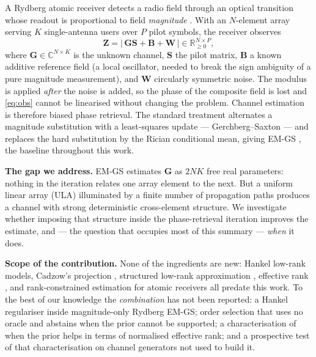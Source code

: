\documentclass[conference]{IEEEtran}
\newcommand{\bG}{\mathbf{G}}
\newcommand{\bS}{\mathbf{S}}
\newcommand{\bB}{\mathbf{B}}
\newcommand{\bW}{\mathbf{W}}
\newcommand{\bZ}{\mathbf{Z}}
\begin{document}
A Rydberg atomic receiver detects a radio field through an optical transition
whose readout is proportional to field \emph{magnitude}
\cite{gong2025mag}. With an $N$-element array serving $K$
single-antenna users over $P$ pilot symbols, the receiver observes
\begin{equation}\label{eq:obs}
\bZ = \bigl|\,\bG\bS + \bB + \bW\,\bigr| \in \mathbb{R}_{\ge0}^{N\times P},
\end{equation}
where $\bG\in\mathbb{C}^{N\times K}$ is the unknown channel, $\bS$ the pilot
matrix, $\bB$ a known additive reference field (a local oscillator, needed to
break the sign ambiguity of a pure magnitude measurement), and $\bW$ circularly
symmetric noise. The modulus is applied \emph{after} the noise is added, so the
phase of the composite field is lost and \eqref{eq:obs} cannot be linearised
without changing the problem. Channel estimation is therefore biased phase
retrieval. The standard treatment alternates a magnitude substitution with a
least-squares update --- Gerchberg--Saxton \cite{gerchberg1972} --- and replaces
the hard substitution by the Rician conditional mean, giving EM-GS
\cite{cui2025,xu2025}, the baseline throughout this work.

\textbf{The gap we address.} EM-GS estimates $\bG$ as $2NK$ free real
parameters: nothing in the iteration relates one array element to the next.
But a uniform linear array (ULA) illuminated by a finite number of propagation
paths produces a channel with strong deterministic cross-element structure. We
investigate whether imposing that structure inside the phase-retrieval
iteration improves the estimate, and --- the question that occupies most of
this summary --- \emph{when} it does.

\textbf{Scope of the contribution.} None of the ingredients are new: Hankel
low-rank models, Cadzow's projection \cite{cadzow1988}, structured low-rank
approximation \cite{markovsky2008}, effective rank \cite{royvetterli2007}, and
rank-constrained estimation for atomic receivers \cite{xu2025} all predate this
work. To the best of our knowledge the \emph{combination} has not been
reported: a Hankel regulariser inside magnitude-only Rydberg EM-GS; order
selection that uses no oracle and abstains when the prior cannot be supported;
a characterisation of when the prior helps in terms of normalised effective
rank; and a prospective test of that characterisation on channel generators not
used to build it.

\end{document}
